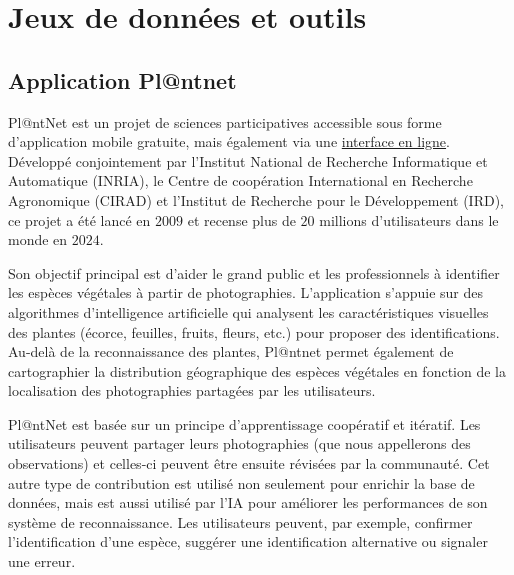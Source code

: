 \documentclass[a4paper,12pt]{article}
\begin{document}
\section{Jeux de données et outils}


\subsection{Application Pl@ntnet}

Pl@ntNet est un projet de sciences participatives accessible sous forme d’application mobile gratuite, mais également via une \href{https://identify.plantnet.org/fr}{interface en ligne}. Développé conjointement par l'Institut National de Recherche Informatique et Automatique (INRIA), le Centre de coopération International en Recherche Agronomique (CIRAD) et l'Institut de Recherche pour le Développement (IRD), ce projet a été lancé en $2009$ et recense plus de $20$ millions d'utilisateurs dans le monde en $2024$. 

\vspace{0.2cm}

Son objectif principal est d'aider le grand public et les professionnels à identifier les espèces végétales à partir de photographies. L'application s'appuie sur des algorithmes d'intelligence artificielle qui analysent les caractéristiques visuelles des plantes (écorce, feuilles, fruits, fleurs, etc.) pour proposer des identifications. Au-delà de la reconnaissance des plantes, Pl@ntnet permet également de cartographier la distribution géographique des espèces végétales en fonction de la localisation des photographies partagées par les utilisateurs.

\vspace{0.2cm}

Pl@ntNet est basée sur un principe d’apprentissage coopératif et itératif. Les utilisateurs peuvent partager leurs photographies (que nous appellerons des observations) et celles-ci peuvent être ensuite révisées par la communauté. Cet autre type de contribution est utilisé non seulement pour enrichir la base de données, mais est aussi utilisé par l’IA pour améliorer les performances de son système de reconnaissance. Les utilisateurs peuvent, par exemple, confirmer l'identification d'une espèce, suggérer une identification alternative ou signaler une erreur.

\vspace{0.2cm}
\end{document}
